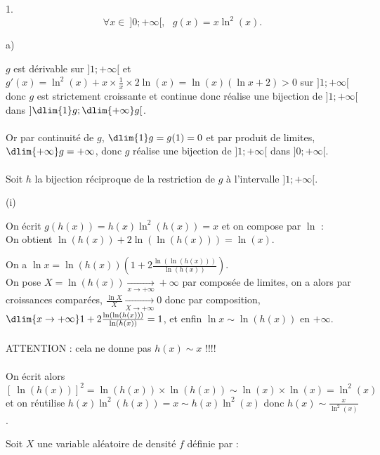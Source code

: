 \documentclass[11pt]{article}%
\begin{document}
\begin{exercice}
\begin{noliste}{1.}
\[
 \forall x \in \ ] 0 ; + \infty[,\ \ \ g(x) = x \ln^{2} (x). 
\]
 \begin{noliste}{a)}
 \setlength{\itemsep}{2mm} 
 \item $g$ est dérivable sur $]1 ; + \infty[$ et $g'(x) = \ln^{2} (x) +
x \times \frac{1}{x} \times 2 \ln (x) = \ln (x) ( \ln x + 2) >0$ sur $]
1 ; + \infty[$ donc $g$ est strictement croissante et continue donc
réalise une bijection de $]1 ; + \infty[$ dans $]\dlim{1} g ; \dlim{+
\infty} g [$. \\
\\
 Or par continuité de $g$, $\dlim{1} g = g(1) = 0$ et par produit de
limites, $\dlim{+ \infty} g = + \infty$, donc $g$ réalise une bijection
de $] 1 ; + \infty [$ dans $] 0 ; + \infty[$. \\
\\
 Soit $h$ la bijection réciproque de la restriction de $g$ à
l'intervalle $]1 ; + \infty[$. 
 \item \begin{nonoliste}{(i)}
 \item On écrit $g( h(x) ) = h(x) \ln^{2} (h(x) ) = x$ et on compose
par $\ln$ : \\
 On obtient $\ln (h(x) ) + 2 \ln ( \ln (h(x) ) ) = \ln (x)$. \\
 \item On a $\ln x = \ln (h(x) ) \left( 1 + 2 \frac{ \ln ( \ln (h (x) )
) }{ \ln ( h(x) )} \right)$. \\
 On pose $X = \ln (h(x)) \xrightarrow[ x \rightarrow + \infty]{} +
\infty$ par composée de limites, on a alors par croissances comparées,
$ \frac{ \ln X }{X} \xrightarrow[X \rightarrow + \infty]{} 0$ donc par
composition, $\dlim{x \rightarrow + \infty} 1 + 2 \frac{ \ln ( \ln (h
(x) ) ) }{ \ln ( h(x) )} = 1$, et enfin $\ln x \sim \ln (h(x) )$ en $ +
\infty$. \\
\\
 ATTENTION : cela ne donne pas $h(x) \sim x$ !!!! \\
\\
 On écrit alors $[ \ \ln (h (x) ) ]^{2} = \ln ( h(x) ) \times \ln (
h(x) ) \sim \ln (x) \times \ln (x) = \ln^{2} (x)$ et on réutilise $h(x)
\ln^{2} (h(x)) = x \sim h(x) \ln^{2} (x)$ donc $h(x) \sim
\frac{x}{\ln^{2} (x)}$. \\
 \end{nonoliste}
 \end{noliste}
 \item Soit $X$ une variable aléatoire de densité $f$ définie par :
 

\end{noliste}
\end{exercice}
\end{document}

